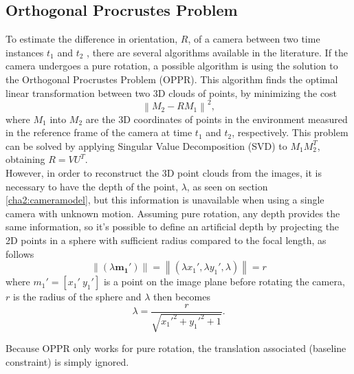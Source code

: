 \subsection{Orthogonal Procrustes Problem}
\label{cha2:opprandsphere}
To estimate the difference in orientation, $R$, of a camera between two time instances $t_1$ and $t_2$ , there are several algorithms available in the literature. If the camera undergoes a pure rotation, a possible algorithm is using the solution to the Orthogonal Procrustes Problem (OPPR). This algorithm finds the optimal linear transformation between two 3D clouds of points, by minimizing the cost
\begin{equation}
\label{sec2:eq:procrustes}
\left \| M_2 - RM_1  \right \|^2 ,
\end{equation}
where $M_1$ into $M_2$ are the 3D coordinates of points in the environment measured in the reference frame of the camera at time $t_1$ and $t_2$, respectively. This problem can be solved by applying Singular Value Decomposition (SVD) to $M_1 M_2^T$, obtaining $R=V U^T$. \cite{procrustes} \\

However, in order to reconstruct the 3D point clouds from the images, it is necessary to have the depth of the point, $\lambda$, as seen on section \ref{cha2:cameramodel}, but this information is unavailable when using a single camera with unknown motion. Assuming pure rotation, any depth provides the same information, so it's possible to define an artificial depth by projecting the 2D points in a sphere with sufficient radius compared to the focal length, as follows
\begin{equation}
	\label{cha2:sec3:eq:spherepro}
	\left \| (\lambda \mathbf{m_1'})  \right \| = \left \| (\lambda x_1', \lambda y_1', \lambda)  \right \| = r
\end{equation}
where $m_1' = [ x_1' \ y_1']$ is a point on the image plane before rotating the camera, $r$ is the radius of the sphere and $\lambda$ then becomes
\begin{equation}
	\label{cha2:sec3:eq:lamdba}
	\lambda = \frac{r}{\sqrt{x_1'^2 + y_1'^2 + 1}}.
\end{equation}

Because OPPR only works for pure rotation, the translation associated (baseline constraint) is simply ignored.


